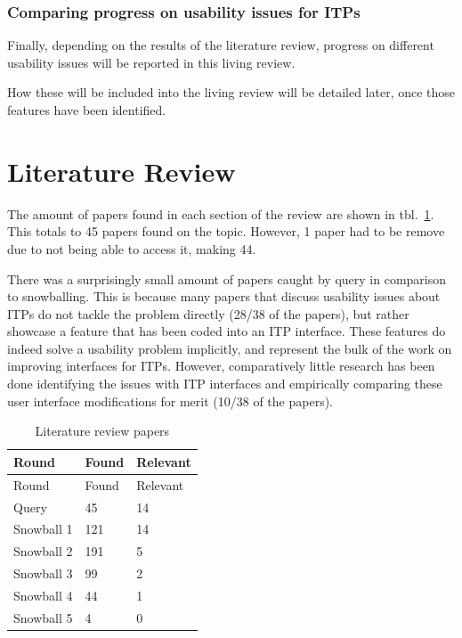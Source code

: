 \documentclass[
]{article}
\begin{document}
\hypertarget{comparing-progress-on-usability-issues-for-itps}{%
\subsubsection{Comparing progress on usability issues for
ITPs}\label{comparing-progress-on-usability-issues-for-itps}}

Finally, depending on the results of the literature review, progress on
different usability issues will be reported in this living review.

How these will be included into the living review will be detailed
later, once those features have been identified.

\hypertarget{literature-review}{%
\section{Literature Review}\label{literature-review}}

The amount of papers found in each section of the review are shown in
tbl.~\ref{tbl:litresults}. This totals to 45 papers found on the topic.
However, 1 paper had to be remove due to not being able to access it,
making 44.

There was a surprisingly small amount of papers caught by query in
comparison to snowballing. This is because many papers that discuss
usability issues about ITPs do not tackle the problem directly (28/38 of
the papers), but rather showcase a feature that has been coded into an
ITP interface. These features do indeed solve a usability problem
implicitly, and represent the bulk of the work on improving interfaces
for ITPs. However, comparatively little research has been done
identifying the issues with ITP interfaces and empirically comparing
these user interface modifications for merit (10/38 of the papers).

\hypertarget{tbl:litresults}{}
\begin{longtable}[]{@{}lll@{}}
\caption{\label{tbl:litresults}Literature review papers}\tabularnewline
\toprule
Round & Found & Relevant \\
\midrule
\endfirsthead
\toprule
Round & Found & Relevant \\
\midrule
\endhead
Query & 45 & 14 \\
Snowball 1 & 121 & 14 \\
Snowball 2 & 191 & 5 \\
Snowball 3 & 99 & 2 \\
Snowball 4 & 44 & 1 \\
Snowball 5 & 4 & 0 \\
\bottomrule
\end{longtable}
\end{document}
